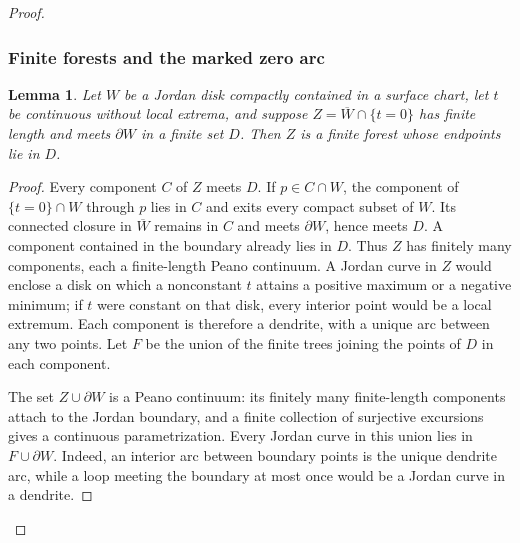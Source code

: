 \documentclass[11pt]{article}
\newtheorem{lemma}[theorem]{Lemma}
\begin{document}
\begin{proof}
\subsubsection{Finite forests and the marked zero arc}
\begin{lemma}\label{lem:forest}
Let $W$ be a Jordan disk compactly contained in a surface chart, let $t$ be continuous without local extrema, and suppose $Z=\overline W\cap\{t=0\}$ has finite length and meets $\partial W$ in a finite set $D$. Then $Z$ is a finite forest whose endpoints lie in $D$.
\end{lemma}
\begin{proof}
Every component $C$ of $Z$ meets $D$. If $p\in C\cap W$, the component of $\{t=0\}\cap W$ through $p$ lies in $C$ and exits every compact subset of $W$. Its connected closure in $\overline W$ remains in $C$ and meets $\partial W$, hence meets $D$. A component contained in the boundary already lies in $D$. Thus $Z$ has finitely many components, each a finite-length Peano continuum. A Jordan curve in $Z$ would enclose a disk on which a nonconstant $t$ attains a positive maximum or a negative minimum; if $t$ were constant on that disk, every interior point would be a local extremum. Each component is therefore a dendrite, with a unique arc between any two points. Let $F$ be the union of the finite trees joining the points of $D$ in each component.

The set $Z\cup\partial W$ is a Peano continuum: its finitely many finite-length components attach to the Jordan boundary, and a finite collection of surjective excursions gives a continuous parametrization. Every Jordan curve in this union lies in $F\cup\partial W$. Indeed, an interior arc between boundary points is the unique dendrite arc, while a loop meeting the boundary at most once would be a Jordan curve in a dendrite.


\end{proof}
\end{proof}
\end{document}
